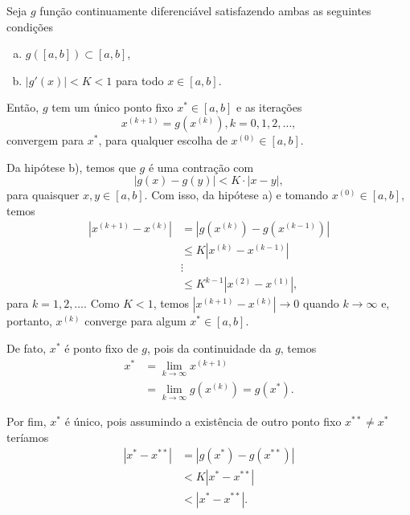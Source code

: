 \begin{teo}\label{cap_eq1d_sec_pfixo:teo:pfixo}
  Seja $g$ função continuamente diferenciável satisfazendo ambas as seguintes condições
  \begin{enumerate}[a)]
  \item $g\left([a, b]\right) \subset [a, b]$,
  \item $|g'(x)|<K<1$ para todo $x\in [a, b]$.
  \end{enumerate}
  Então, $g$ tem um único ponto fixo $x^*\in [a, b]$ e as iterações
  \begin{equation}
    x^{(k+1)}= g\left(x^{(k)}\right), k=0, 1, 2, \ldots,
  \end{equation}
  convergem para $x^*$, para qualquer escolha de $x^{(0)}\in [a, b]$.
\end{teo}
\begin{dem}
  Da hipótese b), temos que $g$ é uma contração com
  \begin{equation}
    \left|g(x) - g(y)\right| < K\cdot |x - y|,
  \end{equation}
  para quaisquer $x,y\in [a, b]$. Com isso, da hipótese a) e tomando $x^{(0)}\in [a, b]$, temos
  \begin{align}
    \left|x^{(k+1)} - x^{(k)}\right| &= \left|g(x^{(k)}) - g(x^{(k-1)})\right|\\
                                     &\leq K \left|x^{(k)} - x^{(k-1)}\right|\\
                                     &\vdots \nonumber\\
                                     &\leq K^{k-1}\left|x^{(2)}-x^{(1)}\right|,
  \end{align}
  para $k=1, 2, \ldots$. Como $K<1$, temos $\left|x^{(k+1)}-x^{(k)}\right|\to 0$ quando $k\to\infty$ e, portanto, $x^{(k)}$ converge para algum $x^*\in [a, b]$.
  
  De fato, $x^*$ é ponto fixo de $g$, pois da continuidade da $g$, temos
  \begin{align}
    x^* &= \lim_{k\to\infty} x^{(k+1)}\\
        &= \lim_{k\to\infty} g(x^{(k)}) = g(x^*).
  \end{align}
  
  Por fim, $x^*$ é único, pois assumindo a existência de outro ponto fixo $x^{**}\neq x^*$ teríamos
  \begin{align}
    |x^* - x^{**}| &= |g(x^*) - g(x^{**})| \\
                   &< K|x^* - x^{**}|\\
                   &< |x^* - x^{**}|.
  \end{align}
\end{dem}

